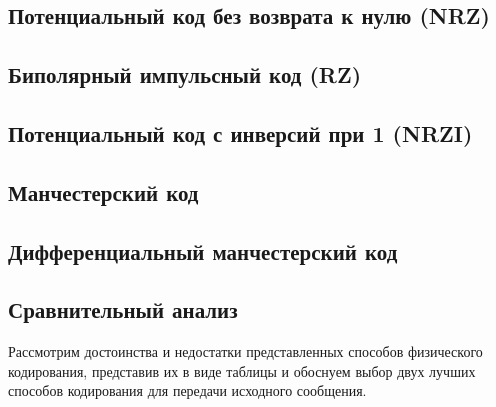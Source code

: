 \subsection{Потенциальный код без возврата к нулю (NRZ)}




\subsection{Биполярный импульсный код (RZ)}




\subsection{Потенциальный код с инверсий при 1 (NRZI)}




\subsection{Манчестерский код}




\subsection{Дифференциальный манчестерский код}




%
% 
% 

\subsection{Сравнительный анализ}
Рассмотрим достоинства и недостатки представленных способов физического кодирования, представив их в виде таблицы и обоснуем выбор двух лучших способов кодирования для передачи исходного сообщения.

